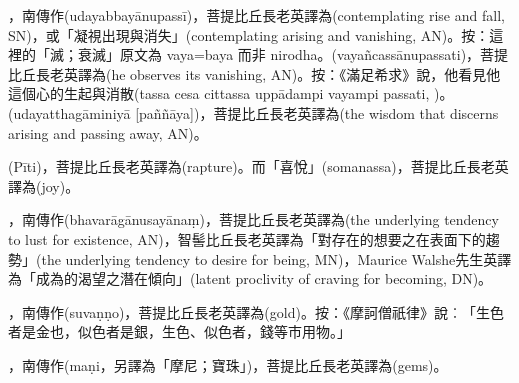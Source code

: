 \startitemgroup[noteitems]
\item{}，南傳作(udayabbayānupassī)，菩提比丘長老英譯為(contemplating rise and fall, SN)，或「凝視出現與消失」(contemplating arising and vanishing, AN)。按：這裡的「滅；衰滅」原文為 vaya=baya 而非 nirodha。(vayañcassānupassati)，菩提比丘長老英譯為(he observes its vanishing, AN)。按：《滿足希求》說，他看見他這個心的生起與消散(tassa cesa cittassa uppādampi vayampi passati, )。(udayatthagāminiyā [paññāya])，菩提比丘長老英譯為(the wisdom that discerns arising and passing away, AN)。
\stopitemgroup

\startitemgroup[noteitems]
\item{}(Pīti)，菩提比丘長老英譯為(rapture)。而「喜悅」(somanassa)，菩提比丘長老英譯為(joy)。
\stopitemgroup

\startitemgroup[noteitems]
\item{}，南傳作(bhavarāgānusayānaṃ)，菩提比丘長老英譯為(the underlying tendency to lust for existence, AN)，智髻比丘長老英譯為「對存在的想要之在表面下的趨勢」(the underlying tendency to desire for being, MN)，Maurice Walshe先生英譯為「成為的渴望之潛在傾向」(latent proclivity of craving for becoming, DN)。
\stopitemgroup

\startitemgroup[noteitems]
\item{}，南傳作(suvaṇṇo)，菩提比丘長老英譯為(gold)。按：《摩訶僧祇律》說︰「生色者是金也，似色者是銀，生色、似色者，錢等市用物。」
\item{}，南傳作(maṇi，另譯為「摩尼；寶珠」)，菩提比丘長老英譯為(gems)。
\stopitemgroup

